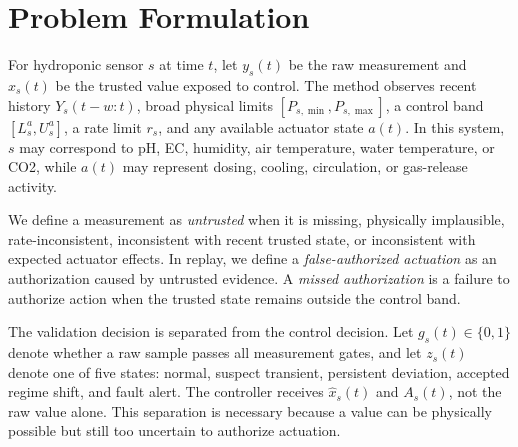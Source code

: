 \documentclass[preprint,12pt,doubleblind]{elsarticle}
\begin{document}
\section{Problem Formulation}
For hydroponic sensor $s$ at time $t$, let $y_s(t)$ be the raw measurement and $\hat{x}_s(t)$ be the trusted value exposed to control. The method observes recent history $Y_s(t-w:t)$, broad physical limits $[P_{s,\min},P_{s,\max}]$, a control band $[L_s^a,U_s^a]$, a rate limit $r_s$, and any available actuator state $a(t)$. In this system, $s$ may correspond to pH, EC, humidity, air temperature, water temperature, or CO2, while $a(t)$ may represent dosing, cooling, circulation, or gas-release activity.

We define a measurement as \emph{untrusted} when it is missing, physically implausible, rate-inconsistent, inconsistent with recent trusted state, or inconsistent with expected actuator effects. In replay, we define a \emph{false-authorized actuation} as an authorization caused by untrusted evidence. A \emph{missed authorization} is a failure to authorize action when the trusted state remains outside the control band.

The validation decision is separated from the control decision. Let $g_s(t)\in\{0,1\}$ denote whether a raw sample passes all measurement gates, and let $z_s(t)$ denote one of five states: normal, suspect transient, persistent deviation, accepted regime shift, and fault alert. The controller receives $\hat{x}_s(t)$ and $A_s(t)$, not the raw value alone. This separation is necessary because a value can be physically possible but still too uncertain to authorize actuation.
\end{document}
